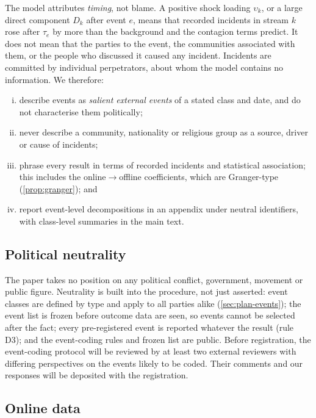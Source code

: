 The model attributes \emph{timing}, not blame. A positive shock loading
$\upsilon_k$, or a large direct component $D_k$ after event $e$, means that
recorded incidents in stream $k$ rose after $\tau_e$ by more than the
background and the contagion terms predict. It does not mean that the
parties to the event, the communities associated with them, or the people
who discussed it caused any incident. Incidents are committed by
individual perpetrators, about whom the model contains no information. We
therefore:
\begin{enumerate}[(i)]
  \item describe events as \emph{salient external events} of a stated class
  and date, and do not characterise them politically;
  \item never describe a community, nationality or religious group as a
  source, driver or cause of incidents;
  \item phrase every result in terms of recorded incidents and statistical
  association; this includes the online$\to$offline coefficients, which
  are Granger-type (\cref{prop:granger}); and
  \item report event-level decompositions in an appendix under neutral
  identifiers, with class-level summaries in the main text.
\end{enumerate}

\subsection{Political neutrality}\label{sec:ethics-neutrality}

The paper takes no position on any political conflict, government, movement
or public figure. Neutrality is built into the procedure, not just asserted:
event classes are defined by type and apply to all parties alike
(\cref{sec:plan-events}); the event list is frozen before outcome data are
seen, so events cannot be selected after the fact; every pre-registered
event is reported whatever the result (rule D3); and the event-coding rules
and frozen list are public. Before registration, the event-coding protocol
will be reviewed by at least two external reviewers with differing
perspectives on the events likely to be coded. Their comments and our
responses will be deposited with the registration.

\subsection{Online data}\label{sec:ethics-online}

